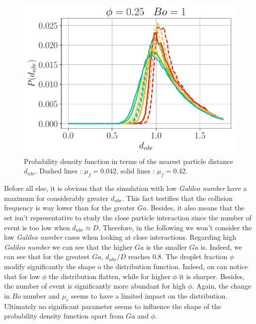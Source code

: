 \begin{figure}[h!]
    \includegraphics[height=0.15\textheight]{image/N_10/Pcond/probaNBo1PHI0_25.pdf}
    \caption{Probability density function in terms of the nearest particle distance $d_{nbr}$. Dashed lines : $\mu_f = 0.042$, solid lines : $\mu_f = 0.42$.} 
    \label{fig:Pdmin}
\end{figure} 
Before all else, it is obvious that the simulation with low \textit{Galileo number} have a maximum for considerably greater $d_{nbr}$. 
This fact testifies that the collision frequency is way lower than for the greater $Ga$. 
Besides, it also means that the set isn't representative to study the close particle interaction since the number of event is too low when $d_{nbr}\approx D$. 
Therefore, in the following we won't consider the low \textit{Galileo number} cases when looking at close interactions.
Regarding high \textit{Galileo number} we can see that the higher $Ga$ is the smaller $Ga$ is. 
Indeed, we can see that for the greatest $Ga$, $d_{nbr}/D$ reaches $0.8$.
The droplet fraction $\phi$ modify significantly the shape o the distribution function. 
Indeed, on can notice that for low $\phi$ the distribution flatten, while for higher $\phi$ it is sharper. 
Besides, the number of event is significantly more abundant for high $\phi$.
Again, the change in $Bo$ number and $\mu_r$ seems to have a limited impact on the distribution. 
Ultimately no significant parameter seems to influence the shape of the probability density function apart from $Ga$ and $\phi$. 

